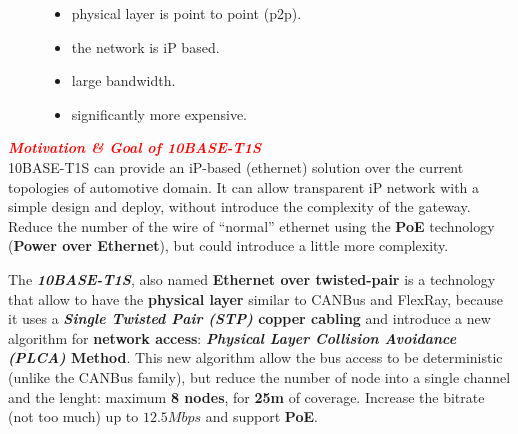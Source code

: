 \begin{figure}[h]
\begin{minipage}[t]{0.45\textwidth}
        \begin{flushleft}
            \begin{itemize}[nosep]
                \item physical layer is point to point (p2p).
                \item the network is iP based.
                \item large bandwidth.
                \item significantly more expensive.
            \end{itemize}
        \end{flushleft}
    \end{minipage}
\end{figure}

\begin{boxA}
    \textcolor{red}{\textbf{\textit{Motivation \& Goal of 10BASE-T1S}}} \\
    10BASE-T1S can provide an iP-based (ethernet) solution over the current topologies of automotive domain. It can allow transparent iP network with a simple design and deploy, without introduce the complexity of the gateway. Reduce the number of the wire of ``normal'' ethernet using the \textbf{PoE} technology (\textbf{Power over Ethernet}), but could introduce a little more complexity.
\end{boxA}

The \textbf{\textit{10BASE-T1S}}, also named \textbf{Ethernet over twisted-pair} is a technology that allow to have the \textbf{physical layer} similar to CANBus and FlexRay, because it uses a \textbf{\textit{Single Twisted Pair (STP)} copper cabling} and introduce a new algorithm for \textbf{network access}: \textbf{\textit{Physical Layer Collision Avoidance (PLCA)} Method}. This new algorithm allow the bus access to be deterministic (unlike the CANBus family), but reduce the number of node into a single channel and the lenght: maximum \textbf{8 nodes}, for \textbf{25m} of coverage. Increase the bitrate (not too much) up to $12.5Mbps$ and support \textbf{PoE}.

\newpage
